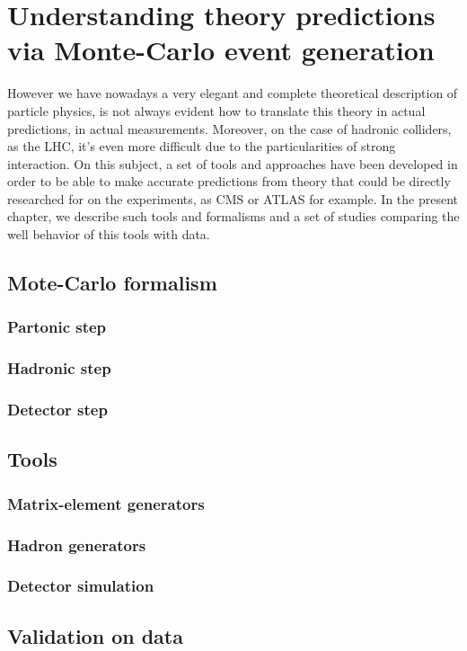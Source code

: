 \chapter[MC event generation]{Understanding theory predictions via Monte-Carlo event generation}
\label{chap:MC}

However we have nowadays a very elegant and complete theoretical description of particle physics, is not always evident how to translate this theory in actual predictions, in actual measurements. Moreover, on the case of hadronic colliders, as the LHC, it's even more difficult due to the particularities of strong interaction. On this subject, a set of tools and approaches have been developed in order to be able to make accurate predictions from theory that could be directly researched for on the experiments, as CMS or ATLAS for example. In the present chapter, we describe such tools and formalisms and a set of studies comparing the well behavior of this tools with data. 

\section{Mote-Carlo formalism}
\label{sec:MC}

\subsection{Partonic step}
\label{sec:parton}

\subsection{Hadronic step}
\label{sec:hadron}

\subsection{Detector step}
\label{sec:detector}


\section{Tools}
\label{sec:tools}

\subsection{Matrix-element generators}
\label{sec:ME}

\subsection{Hadron generators}
\label{sec:Had}

\subsection{Detector simulation}
\label{sec:det}

\section{Validation on data}
\label{sec:val}

